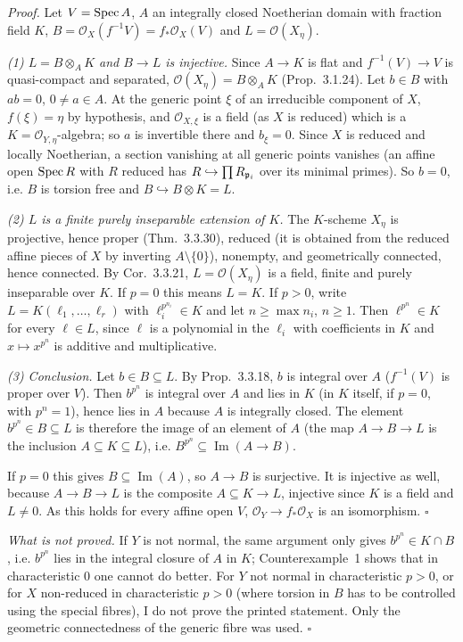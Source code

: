 \documentclass[11pt]{article}
\begin{document}
\emph{Proof.} Let $V=\operatorname{Spec} A$, $A$ an integrally closed Noetherian domain with fraction field $K$, $B=\mathcal O_X(f^{-1}V)=f_*\mathcal O_X(V)$ and $L=\mathcal O(X_\eta)$.

\emph{(1) $L=B\otimes_AK$ and $B\to L$ is injective.} Since $A\to K$ is flat and $f^{-1}(V)\to V$ is quasi-compact and separated, $\mathcal O(X_\eta)=B\otimes_AK$ (Prop.~3.1.24). Let $b\in B$ with $ab=0$, $0\neq a\in A$. At the generic point $\xi$ of an irreducible component of $X$, $f(\xi)=\eta$ by hypothesis, and $\mathcal O_{X,\xi}$ is a field (as $X$ is reduced) which is a $K=\mathcal O_{Y,\eta}$-algebra; so $a$ is invertible there and $b_\xi=0$. Since $X$ is reduced and locally Noetherian, a section vanishing at all generic points vanishes (an affine open $\operatorname{Spec} R$ with $R$ reduced has $R\hookrightarrow\prod R_{\mathfrak p_i}$ over its minimal primes). So $b=0$, i.e. $B$ is torsion free and $B\hookrightarrow B\otimes K=L$.

\emph{(2) $L$ is a finite purely inseparable extension of $K$.} The $K$-scheme $X_\eta$ is projective, hence proper (Thm.~3.3.30), reduced (it is obtained from the reduced affine pieces of $X$ by inverting $A\setminus\{0\}$), nonempty, and geometrically connected, hence connected. By Cor.~3.3.21, $L=\mathcal O(X_\eta)$ is a field, finite and purely inseparable over $K$. If $p=0$ this means $L=K$. If $p>0$, write $L=K(\ell_1,\dots,\ell_r)$ with $\ell_i^{p^{n_i}}\in K$ and let $n\ge\max n_i$, $n\ge1$. Then $\ell^{p^n}\in K$ for every $\ell\in L$, since $\ell$ is a polynomial in the $\ell_i$ with coefficients in $K$ and $x\mapsto x^{p^n}$ is additive and multiplicative.

\emph{(3) Conclusion.} Let $b\in B\subseteq L$. By Prop.~3.3.18, $b$ is integral over $A$ ($f^{-1}(V)$ is proper over $V$). Then $b^{p^n}$ is integral over $A$ and lies in $K$ (in $K$ itself, if $p=0$, with $p^n=1$), hence lies in $A$ because $A$ is integrally closed. The element $b^{p^n}\in B\subseteq L$ is therefore the image of an element of $A$ (the map $A\to B\to L$ is the inclusion $A\subseteq K\subseteq L$), i.e. $B^{p^n}\subseteq\operatorname{Im}(A\to B)$.

If $p=0$ this gives $B\subseteq\operatorname{Im}(A)$, so $A\to B$ is surjective. It is injective as well, because $A\to B\to L$ is the composite $A\subseteq K\to L$, injective since $K$ is a field and $L\neq0$. As this holds for every affine open $V$, $\mathcal O_Y\to f_*\mathcal O_X$ is an isomorphism. \hfill$\square$

\emph{What is not proved.} If $Y$ is not normal, the same argument only gives $b^{p^n}\in K\cap B$, i.e. $b^{p^n}$ lies in the integral closure of $A$ in $K$; Counterexample~1 shows that in characteristic $0$ one cannot do better. For $Y$ not normal in characteristic $p>0$, or for $X$ non-reduced in characteristic $p>0$ (where torsion in $B$ has to be controlled using the special fibres), I do not prove the printed statement. Only the geometric connectedness of the generic fibre was used. \hfill$\square$
\end{document}
